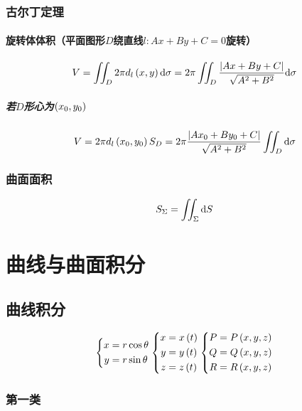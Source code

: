 \documentclass{article}
\begin{document}
\subsubsection{古尔丁定理}

\paragraph{旋转体体积（平面图形$D$绕直线$l:Ax+By+C=0$旋转）}

\[V=\iint_D2\pi d_l\left(x,y\right)\mathrm d\sigma=2\pi\iint_D\frac{\left|Ax+By+C\right|}{\sqrt{A^2+B^2}}\mathrm d\sigma\]

\subparagraph{若$D$形心为$\left(x_0,y_0\right)$}

\[V=2\pi d_l\left(x_0,y_0\right)S_D=2\pi\frac{\left|Ax_0+By_0+C\right|}{\sqrt{A^2+B^2}}\iint_D\mathrm d\sigma\]

\subsubsection{曲面面积}

\[S_\Sigma=\iint_\Sigma\mathrm d S\]

\section{曲线与曲面积分}

\subsection{曲线积分}

\begin{definition}[]
    \[\left\{\begin{aligned}
            x & =r\cos\theta \\
            y & =r\sin\theta
        \end{aligned}\right.
        \left\{\begin{aligned}
            x & =x\left(t\right) \\
            y & =y\left(t\right) \\
            z & =z\left(t\right)
        \end{aligned}\right.
        \left\{\begin{aligned}
            P & =P\left(x,y,z\right) \\
            Q & =Q\left(x,y,z\right) \\
            R & =R\left(x,y,z\right)
        \end{aligned}\right.\]
\end{definition}

\subsubsection{第一类}
\end{document}
